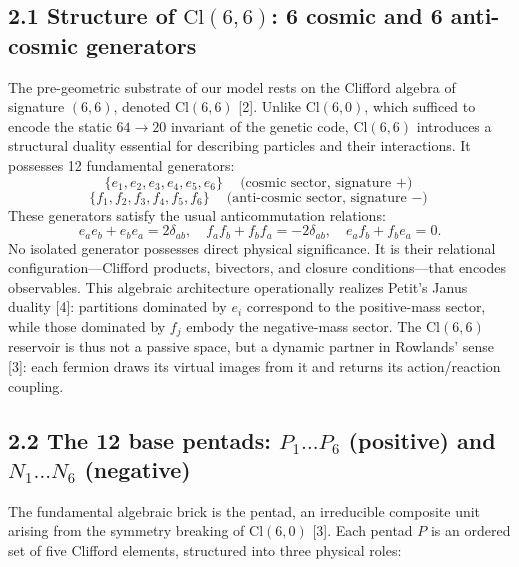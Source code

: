 \documentclass[11pt]{article}
\begin{document}
\hypertarget{structure-of-textcl66-6-cosmic-and-6-anti-cosmic-generators}{%
\subsection{\texorpdfstring{2.1 Structure of \(\text{Cl}(6,6)\): 6
cosmic and 6 anti-cosmic
generators}{2.1 Structure of \textbackslash text\{Cl\}(6,6): 6 cosmic and 6 anti-cosmic generators}}\label{structure-of-textcl66-6-cosmic-and-6-anti-cosmic-generators}}

The pre-geometric substrate of our model rests on the Clifford algebra
of signature \((6,6)\), denoted \(\text{Cl}(6,6)\) {[}2{]}. Unlike
\(\text{Cl}(6,0)\), which sufficed to encode the static \(64 \to 20\)
invariant of the genetic code, \(\text{Cl}(6,6)\) introduces a
structural duality essential for describing particles and their
interactions. It possesses 12 fundamental generators: \[
\{e_1, e_2, e_3, e_4, e_5, e_6\} \quad \text{(cosmic sector, signature $+$)}
\] \[
\{f_1, f_2, f_3, f_4, f_5, f_6\} \quad \text{(anti-cosmic sector, signature $-$)}
\] These generators satisfy the usual anticommutation relations: \[
e_a e_b + e_b e_a = 2\delta_{ab}, \quad f_a f_b + f_b f_a = -2\delta_{ab}, \quad e_a f_b + f_b e_a = 0.
\] No isolated generator possesses direct physical significance. It is
their relational configuration---Clifford products, bivectors, and
closure conditions---that encodes observables. This algebraic
architecture operationally realizes Petit's Janus duality {[}4{]}:
partitions dominated by \(e_i\) correspond to the positive-mass sector,
while those dominated by \(f_j\) embody the negative-mass sector. The
\(\text{Cl}(6,6)\) reservoir is thus not a passive space, but a dynamic
partner in Rowlands' sense {[}3{]}: each fermion draws its virtual
images from it and returns its action/reaction coupling.

\hypertarget{the-12-base-pentads-p_1dots-p_6-positive-and-n_1dots-n_6-negative}{%
\subsection{\texorpdfstring{2.2 The 12 base pentads: \(P_1\dots P_6\)
(positive) and \(N_1\dots N_6\)
(negative)}{2.2 The 12 base pentads: P\_1\textbackslash dots P\_6 (positive) and N\_1\textbackslash dots N\_6 (negative)}}\label{the-12-base-pentads-p_1dots-p_6-positive-and-n_1dots-n_6-negative}}

The fundamental algebraic brick is the pentad, an irreducible composite
unit arising from the symmetry breaking of \(\text{Cl}(6,0)\) {[}3{]}.
Each pentad \(P\) is an ordered set of five Clifford elements,
structured into three physical roles:
\end{document}
